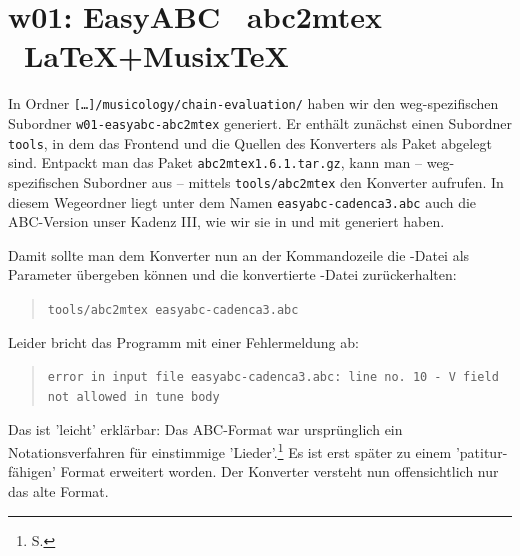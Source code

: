 %
%
%

\section{w01: Easy\-ABC \ra\ abc2mtex \ra\ \LaTeX+Musix\TeX}\label{w01}

In Ordner \texttt{[\ldots]/musicology/chain-evaluation/} haben wir den
weg-spezifischen Subordner \texttt{w01-easyabc-abc2mtex} generiert.
Er enthält zunächst einen Subordner \texttt{tools}, in dem das Frontend
 und die Quellen des Konverters  als Paket abgelegt
sind. Entpackt man das Paket \texttt{abc2mtex1.6.1.tar.gz}, kann man --
weg-spezifischen Subordner aus -- mittels \texttt{tools/abc2mtex} den Konverter
aufrufen. In diesem Wegeordner liegt unter dem Namen
\texttt{easyabc-cadenca3.abc} auch die ABC-Version unser Kadenz III, wie wir sie
in und mit  generiert haben.

Damit sollte man dem Konverter  nun an der Kommandozeile die
-Datei als Parameter übergeben können und die konvertierte
-Datei zurückerhalten:

\begin{quote}\texttt{tools/abc2mtex easyabc-cadenca3.abc}\end{quote}

Leider bricht das Programm mit einer Fehlermeldung ab:

\begin{quote}\texttt{error in input file easyabc-cadenca3.abc: line no. 10 - V
field not allowed in tune body }\end{quote}

Das ist 'leicht' erklärbar: Das ABC-Format war ursprünglich ein
Notationsverfahren für einstimmige 'Lieder'.\footnote{\ra S. \pageref{ABCMethod}}
Es ist erst später zu einem 'patitur-fähigen' Format erweitert worden. Der
Konverter  versteht nun offensichtlich nur das alte Format.
 
